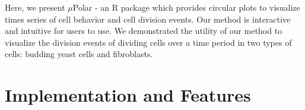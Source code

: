 \documentclass[conference]{IEEEtran}
\begin{document}
Here, we present $\mu$Polar - an R package which provides circular plots to visualize times series of cell behavior and cell division events. Our method is interactive and intuitive for users to use. We demonstrated the utility of our method to visualize the division events of dividing cells over a time period in two types of cells: budding yeast cells and fibroblasts. 


 
 
 
 
 

\section{Implementation and Features}
\end{document}
